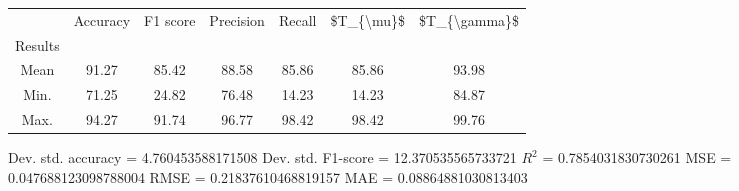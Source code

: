 \begin{tabular}{|c|c|c|c|c|c|c|}
\toprule
{} &  Accuracy &  F1 score &  Precision &  Recall &  \$T\_\{\textbackslash mu\}\$ &  \$T\_\{\textbackslash gamma\}\$ \\
Results &           &           &            &         &            &               \\
\hline
Mean    &     91.27 &     85.42 &      88.58 &   85.86 &      85.86 &         93.98 \\
Min.    &     71.25 &     24.82 &      76.48 &   14.23 &      14.23 &         84.87 \\
Max.    &     94.27 &     91.74 &      96.77 &   98.42 &      98.42 &         99.76 \\
\bottomrule
\end{tabular}

 Dev. std. accuracy = 4.760453588171508
 Dev. std. F1-score = 12.370535565733721
 $R^2$ = 0.7854031830730261
 MSE = 0.047688123098788004
 RMSE = 0.21837610468819157
 MAE = 0.08864881030813403